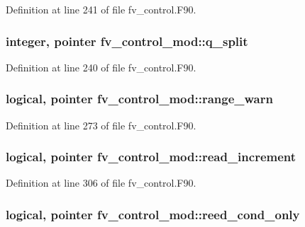 Definition at line 241 of file fv\-\_\-control.\-F90.

\subsubsection[{q\-\_\-split}]{\setlength{\rightskip}{0pt plus 5cm}integer, pointer fv\-\_\-control\-\_\-mod\-::q\-\_\-split\hspace{0.3cm}{\ttfamily [private]}}\label{classfv__control__mod_a783be2fb9b692752e90b4ca57504be48}


Definition at line 240 of file fv\-\_\-control.\-F90.

\subsubsection[{range\-\_\-warn}]{\setlength{\rightskip}{0pt plus 5cm}logical, pointer fv\-\_\-control\-\_\-mod\-::range\-\_\-warn\hspace{0.3cm}{\ttfamily [private]}}\label{classfv__control__mod_a1ebd288b513de31ca3790fd7b5ae49b3}


Definition at line 273 of file fv\-\_\-control.\-F90.

\subsubsection[{read\-\_\-increment}]{\setlength{\rightskip}{0pt plus 5cm}logical, pointer fv\-\_\-control\-\_\-mod\-::read\-\_\-increment\hspace{0.3cm}{\ttfamily [private]}}\label{classfv__control__mod_a3a2a138b7e1dcfd1f7bd0e2bda7a2ebf}


Definition at line 306 of file fv\-\_\-control.\-F90.

\subsubsection[{reed\-\_\-cond\-\_\-only}]{\setlength{\rightskip}{0pt plus 5cm}logical, pointer fv\-\_\-control\-\_\-mod\-::reed\-\_\-cond\-\_\-only\hspace{0.3cm}{\ttfamily [private]}}\label{classfv__control__mod_a2b3d0562dc8b3bf11a64ed364e054869}


